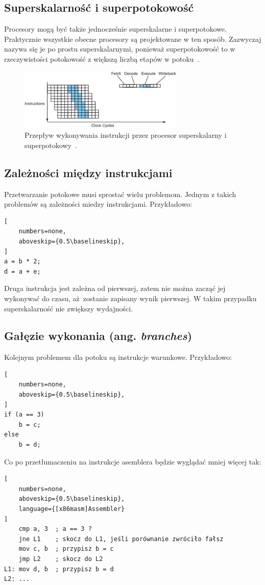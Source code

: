 \subsection{Superskalarność i superpotokowość}

Procesory mogą być także jednocześnie superskalarne i superpotokowe. Praktycznie wszystkie obecne procesory są projektowane w ten sposób. Zazwyczaj nazywa się je po prostu superskalarnymi, ponieważ superpotokowość to w rzeczywistości potokowość z większą liczbą etapów w potoku~\cite{ModernMicroprocessors90MinGuide}. 

\begin{figure}[!h]
	\centering
	\includegraphics[width=0.7\textwidth]{images/superpipelinedsuperscalar2}
	\caption{Przepływ wykonywania instrukcji przez procesor superskalarny i superpotokowy~\cite{ModernMicroprocessors90MinGuide}.}
\end{figure}

\subsection{Zależności między instrukcjami}

Przetwarzanie potokowe musi sprostać wielu problemom. Jednym z takich problemów są zależności miedzy instrukcjami. Przykładowo:

\begin{lstlisting}[
    numbers=none,
    aboveskip={0.5\baselineskip},
]
a = b * 2;
d = a + e;
\end{lstlisting}

Druga instrukcja jest zależna od pierwszej, zatem nie można zacząć jej wykonywać do czasu, aż~zostanie zapisany wynik pierwszej.
W takim przypadku superskalarność nie zwiększy wydajności.


\subsection{Gałęzie wykonania (ang. \textit{branches})}
\label{sub:branches}
Kolejnym problemem dla potoku są instrukcje warunkowe. Przykładowo:

\begin{lstlisting}[
    numbers=none,
    aboveskip={0.5\baselineskip},
]
if (a == 3)
    b = c;
else
    b = d;
\end{lstlisting}
Co po przetłumaczeniu na instrukcje asemblera będzie wyglądać mniej więcej tak:
\begin{lstlisting}[
    numbers=none,
    aboveskip={0.5\baselineskip},
    language={[x86masm]Assembler}
]
	cmp a, 3  ; a == 3 ?
	jne L1	  ; skocz do L1, jeśli porównanie zwróciło fałsz
	mov c, b  ; przypisz b = c
	jmp L2	  ; skocz do L2
L1:	mov d, b  ; przypisz b = d
L2:	...
\end{lstlisting}

